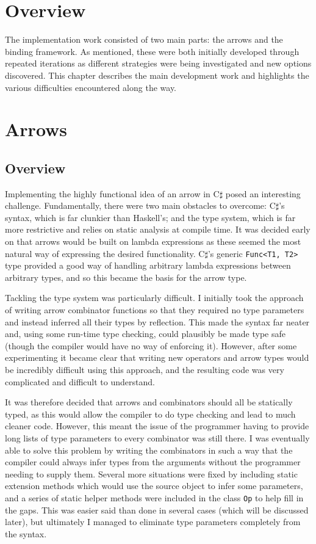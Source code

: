 \documentclass[12pt,twoside,notitlepage]{report}
\begin{document}
\section{Overview}

The implementation work consisted of two main parts: the arrows and the binding framework. As mentioned, these were both initially developed through repeated iterations as different strategies were being investigated and new options discovered. This chapter describes the main development work and highlights the various difficulties encountered along the way.


\section{Arrows}

\subsection{Overview} \label{sec:arrows_overview}

Implementing the highly functional idea of an arrow in C$\sharp$ posed an interesting challenge. Fundamentally, there were two main obstacles to overcome: C$\sharp$'s syntax, which is far clunkier than Haskell's; and the type system, which is far more restrictive and relies on static analysis at compile time. It was decided early on that arrows would be built on lambda expressions as these seemed the most natural way of expressing the desired functionality. C$\sharp$'s generic \texttt{Func<T1, T2>} type provided a good way of handling arbitrary lambda expressions between arbitrary types, and so this became the basis for the arrow type.

Tackling the type system was particularly difficult. I initially took the approach of writing arrow combinator functions so that they required no type parameters and instead inferred all their types by reflection. This made the syntax far neater and, using some run-time type checking, could plausibly be made type safe (though the compiler would have no way of enforcing it). However, after some experimenting it became clear that writing new operators and arrow types would be incredibly difficult using this approach, and the resulting code was very complicated and difficult to understand.

It was therefore decided that arrows and combinators should all be statically typed, as this would allow the compiler to do type checking and lead to much cleaner code. However, this meant the issue of the programmer having to provide long lists of type parameters to every combinator was still there. I was eventually able to solve this problem by writing the combinators in such a way that the compiler could always infer types from the arguments without the programmer needing to supply them. Several more situations were fixed by including static extension methods which would use the source object to infer some parameters, and a series of static helper methods were included in the class \texttt{Op} to help fill in the gaps. This was easier said than done in several cases (which will be discussed later), but ultimately I managed to eliminate type parameters completely from the syntax.
\end{document}
